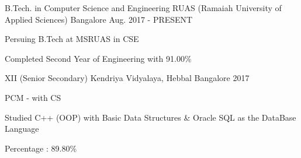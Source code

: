 \begin{cventries}
  \cventry
    {B.Tech. in Computer Science and Engineering}
    {RUAS (Ramaiah University of Applied Sciences)}
    {Bangalore}
    {Aug. 2017 - PRESENT}
    {
      \begin{cvitems}
        \item {Persuing B.Tech at MSRUAS in CSE}
        \item {Completed Second Year of Engineering with 91.00\%}
      \end{cvitems}
    }
  \cventry
    {XII (Senior Secondary)}
    {Kendriya Vidyalaya, Hebbal}
    {Bangalore}
    {2017}
    {
      \begin{cvitems}
        \item {PCM - with CS}
        \item {Studied C++ (OOP) with Basic Data Structures \& Oracle SQL as the DataBase Language}
        \item {Percentage : 89.80\%}
      \end{cvitems}
    }
\end{cventries}
